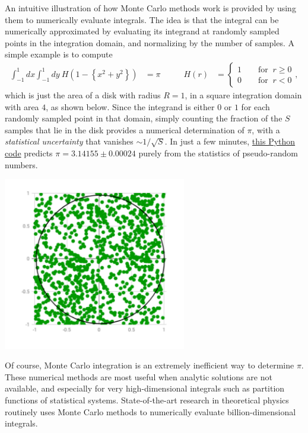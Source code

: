 An intuitive illustration of how Monte Carlo methods work is provided by using them to numerically evaluate integrals.
The idea is that the integral can be numerically approximated by evaluating its integrand at randomly sampled points in the integration domain, and normalizing by the number of samples.
A simple example is to compute
\begin{align*}
  \int_{-1}^1 dx \int_{-1}^1 dy \ H\!\left(1 - \left\{x^2 + y^2\right\}\right) & = \pi \qquad &
  H(r) & = \left\{\begin{array}{l}1 \qquad \mbox{for } \ r \geq 0 \\
                                  0 \qquad \mbox{for } \ r < 0\end{array}\right. ,
\end{align*}
which is just the area of a disk with radius $R = 1$, in a square integration domain with area $4$, as shown below.
Since the integrand is either $0$ or $1$ for each randomly sampled point in that domain, simply counting the fraction of the $S$ samples that lie in the disk provides a numerical determination of $\pi$, with a \textit{statistical uncertainty} that vanishes $\sim 1 / \sqrt{S}$.
In just a few minutes, \href{https://github.com/daschaich/MATH327_2122/blob/master/lecture_notes/unit10_pi.py}{this Python code} predicts $\pi = 3.14155 \pm 0.00024$ purely from the statistics of pseudo-random numbers.

\begin{center}\includegraphics[width=0.6\textwidth]{figs/unit10_pi.pdf}\end{center}

Of course, Monte Carlo integration is an extremely inefficient way to determine $\pi$.
These numerical methods are most useful when analytic solutions are not available, and especially for very high-dimensional integrals such as partition functions of statistical systems.
State-of-the-art research in theoretical physics routinely uses Monte Carlo methods to numerically evaluate billion-dimensional integrals.

